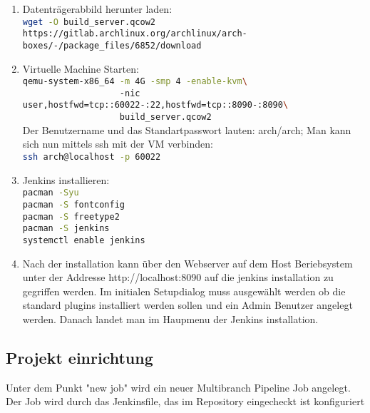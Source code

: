 \begin{enumerate}
    \item Datenträgerabbild herunter laden:\\
        \lstinline[language=sh]!wget -O build_server.qcow2 https://gitlab.archlinux.org/archlinux/arch-boxes/-/package_files/6852/download!
    \item Virtuelle Machine Starten:\\
    \lstinline[language=sh]!qemu-system-x86_64 -m 4G -smp 4 -enable-kvm\! \\
    \lstinline[language=sh]!                   -nic user,hostfwd=tcp::60022-:22,hostfwd=tcp::8090-:8090\ !\\
    \lstinline[language=sh]!                   build_server.qcow2!\\
    Der Benutzername und das Standartpasswort lauten: arch/arch; Man kann sich nun mittels ssh mit der \ac{VM} verbinden:\\
    \lstinline[language=sh]!ssh arch@localhost -p 60022!\\
    \item Jenkins installieren:\\
    \lstinline[language=sh]!pacman -Syu !\\
    \lstinline[language=sh]!pacman -S fontconfig!\\
    \lstinline[language=sh]!pacman -S freetype2!\\
    \lstinline[language=sh]!pacman -S jenkins!\\
    \lstinline[language=sh]!systemctl enable jenkins!\\
    \item Nach der installation kann über den Webserver auf dem Host Beriebsystem unter der Addresse http://localhost:8090 auf die jenkins installation zu gegriffen werden. Im initialen Setupdialog muss ausgewählt werden ob die standard plugins installiert werden sollen und ein Admin Benutzer angelegt werden. Danach landet man im Haupmenu der Jenkins installation.
\end{enumerate}

\subsection{Projekt einrichtung}

Unter dem Punkt "new job" wird ein neuer Multibranch Pipeline Job angelegt. Der Job wird durch das Jenkinsfile, das im Repository eingecheckt ist konfiguriert
